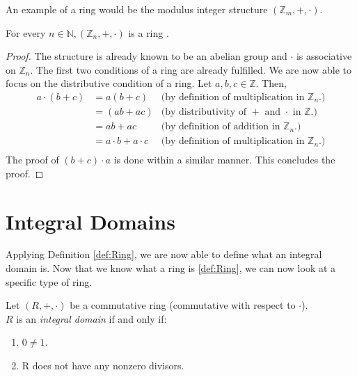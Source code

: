 \documentclass{article}
\begin{document}
An example of a ring would be the modulus integer structure $(\mathbb{Z}_m, +,\cdot)$.

\begin{theorem}\label{thm:ring_example}
    For every $n \in \mathbb{N}, (\mathbb{Z}_n, +,\cdot)$ is a ring \cite{AdvancedMath}.
\end{theorem}

\begin{proof}
    The structure is already known to be an abelian group and $\cdot$ is associative on $\mathbb{Z}_n$. The first two conditions of a ring are already fulfilled. We are now able to focus on the distributive condition of a ring. Let $a,b,c \in \mathbb{Z}$. Then,
    \begin{align*}
        a \cdot (b + c) &= a(b + c) &\text{(by definition of multiplication in $\mathbb{Z}_n$.)}\\
        &= (ab + ac) &\text{(by distributivity of $+$ and $\cdot$ in $\mathbb{Z}$.)}\\
        &= ab + ac &\text{(by definition of addition in $\mathbb{Z}_n$.)}\\
        &= a \cdot b + a \cdot c &\text{(by definition of multiplication in $\mathbb{Z}_n$.)}\\
    \end{align*}
    The proof of $(b + c) \cdot a$ is done within a similar manner.
    This concludes the proof.
\end{proof}

\section{Integral Domains}

Applying Definition \ref{def:Ring}, we are now able to define what an integral domain is.
Now that we know what a ring is \ref{def:Ring}, we can now look at a specific type of ring.

\begin{definition}\label{def:integralDomain}
    Let $(R,+,\cdot)$ be a commutative ring (commutative with respect to $\cdot$). \\  
    $R$ is an \emph{integral domain} if and only if:
    \begin{enumerate}
        \item $0 \neq 1$.
        \item R does not have any nonzero divisors.
    \end{enumerate}
\end{definition} \cite{AdvancedMath} \\ %
\end{document}
